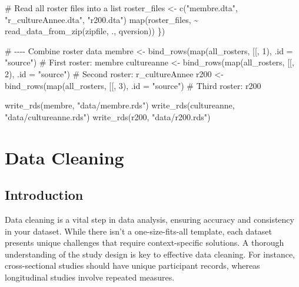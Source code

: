 \documentclass[
  letterpaper,
  DIV=11,
  numbers=noendperiod]{scrreprt}
\newenvironment{Shaded}{\begin{snugshade}}{\end{snugshade}}
\newcommand{\AttributeTok}[1]{\textcolor[rgb]{0.40,0.45,0.13}{#1}}
\newcommand{\CommentTok}[1]{\textcolor[rgb]{0.37,0.37,0.37}{#1}}
\newcommand{\DecValTok}[1]{\textcolor[rgb]{0.68,0.00,0.00}{#1}}
\newcommand{\FunctionTok}[1]{\textcolor[rgb]{0.28,0.35,0.67}{#1}}
\newcommand{\NormalTok}[1]{\textcolor[rgb]{0.00,0.23,0.31}{#1}}
\newcommand{\OtherTok}[1]{\textcolor[rgb]{0.00,0.23,0.31}{#1}}
\newcommand{\SpecialCharTok}[1]{\textcolor[rgb]{0.37,0.37,0.37}{#1}}
\newcommand{\StringTok}[1]{\textcolor[rgb]{0.13,0.47,0.30}{#1}}
\begin{document}
\begin{Shaded}
\begin{Highlighting}[]
  \CommentTok{\# Read all roster files into a list}
\NormalTok{  roster\_files }\OtherTok{\textless{}{-}} \FunctionTok{c}\NormalTok{(}\StringTok{"membre.dta"}\NormalTok{, }\StringTok{"r\_cultureAnnee.dta"}\NormalTok{, }\StringTok{"r200.dta"}\NormalTok{)}
  \FunctionTok{map}\NormalTok{(roster\_files, }\SpecialCharTok{\textasciitilde{}} \FunctionTok{read\_data\_from\_zip}\NormalTok{(zipfile, ., qversion))}
\NormalTok{\})}

\CommentTok{\# {-}{-}{-}{-} Combine roster data}
\NormalTok{membre }\OtherTok{\textless{}{-}} \FunctionTok{bind\_rows}\NormalTok{(}\FunctionTok{map}\NormalTok{(all\_rosters, }\StringTok{\textasciigrave{}}\AttributeTok{[[}\StringTok{\textasciigrave{}}\NormalTok{, }\DecValTok{1}\NormalTok{), }\AttributeTok{.id =} \StringTok{"source"}\NormalTok{)  }\CommentTok{\# First roster: membre}
\NormalTok{cultureanne }\OtherTok{\textless{}{-}} \FunctionTok{bind\_rows}\NormalTok{(}\FunctionTok{map}\NormalTok{(all\_rosters, }\StringTok{\textasciigrave{}}\AttributeTok{[[}\StringTok{\textasciigrave{}}\NormalTok{, }\DecValTok{2}\NormalTok{), }\AttributeTok{.id =} \StringTok{"source"}\NormalTok{)  }\CommentTok{\# Second roster: r\_cultureAnnee}
\NormalTok{r200 }\OtherTok{\textless{}{-}} \FunctionTok{bind\_rows}\NormalTok{(}\FunctionTok{map}\NormalTok{(all\_rosters, }\StringTok{\textasciigrave{}}\AttributeTok{[[}\StringTok{\textasciigrave{}}\NormalTok{, }\DecValTok{3}\NormalTok{), }\AttributeTok{.id =} \StringTok{"source"}\NormalTok{)  }\CommentTok{\# Third roster: r200}


\FunctionTok{write\_rds}\NormalTok{(membre, }\StringTok{"data/membre.rds"}\NormalTok{)}
\FunctionTok{write\_rds}\NormalTok{(cultureanne, }\StringTok{"data/cultureanne.rds"}\NormalTok{)}
\FunctionTok{write\_rds}\NormalTok{(r200, }\StringTok{"data/r200.rds"}\NormalTok{)}
\end{Highlighting}
\end{Shaded}


\chapter{Data Cleaning}\label{data-cleaning}

\section{Introduction}\label{introduction-3}

Data cleaning is a vital step in data analysis, ensuring accuracy and
consistency in your dataset. While there isn't a one-size-fits-all
template, each dataset presents unique challenges that require
context-specific solutions. A thorough understanding of the study design
is key to effective data cleaning. For instance, cross-sectional studies
should have unique participant records, whereas longitudinal studies
involve repeated measures.
\end{document}
